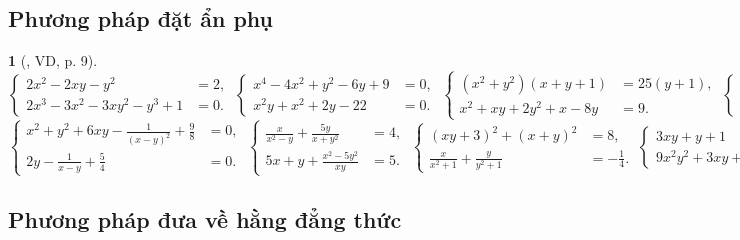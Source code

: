 \documentclass{article}
\newtheorem{baitoan}{}
\begin{document}
\subsection{Phương pháp đặt ẩn phụ}

\begin{baitoan}[\cite{Kien_dai_so_9}, VD, p. 9]
	\begin{equation*}
		\left\{\begin{split}
			2x^2 -2xy - y^2 &= 2,\\
			2x^3 - 3x^2 - 3xy^2 - y^3 + 1 &= 0.
		\end{split}\right.\ \left\{\begin{split}
			x^4 - 4x^2 + y^2 - 6y + 9 &= 0,\\
			x^2y + x^2 + 2y - 22 &= 0.
		\end{split}\right.\ \left\{\begin{split}
			(x^2 + y^2)(x + y + 1) &= 25(y + 1),\\
			x^2 + xy + 2y^2 + x - 8y &= 9.
		\end{split}\right.\ \left\{\begin{split}
			8x^3y^3 + 27 &= 18y^3,\\
			4x^2y + 6x &= y^2.
		\end{split}\right.
	\end{equation*}
	\begin{equation*}
		\left\{\begin{split}
			x^2 + y^2 + 6xy - \frac{1}{(x - y)^2} + \frac{9}{8} &= 0,\\
			2y - \frac{1}{x - y} + \frac{5}{4} &= 0.
		\end{split}\right.\ \left\{\begin{split}
			\frac{x}{x^2 - y} + \frac{5y}{x + y^2} &= 4,\\
			5x + y + \frac{x^2 - 5y^2}{xy} &= 5.
		\end{split}\right.\ \left\{\begin{split}
			(xy + 3)^2 + (x + y)^2 &= 8,\\
			\frac{x}{x^2 + 1} + \frac{y}{y^2 + 1} &= -\frac{1}{4}.
		\end{split}\right.\ \left\{\begin{split}
			3xy + y + 1 &= 21x,\\
			9x^2y^2 + 3xy + 1 &= 117x^2.
		\end{split}\right.
	\end{equation*}
\end{baitoan}

\subsection{Phương pháp đưa về hằng đẳng thức}
\end{document}
